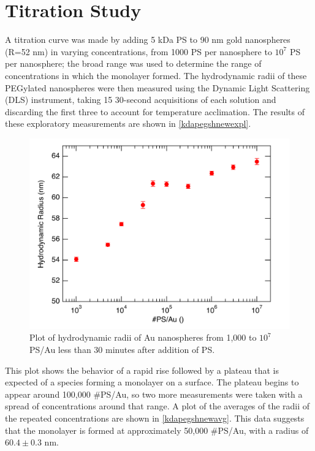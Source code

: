 \section{Titration Study}
\label{titrationstudy}

A titration curve was made by adding 5 kDa PS to 90 nm gold nanospheres (R=52 nm) in varying concentrations, from 1000 PS per nanosphere to $10^7$ PS per nanosphere; the broad range was used to determine the range of concentrations in which the monolayer formed. The hydrodynamic radii of these PEGylated nanospheres were then measured using the Dynamic Light Scattering (DLS) instrument, taking 15 30-second acquisitions of each solution and discarding the first three to account for temperature acclimation. The results of these exploratory measurements are shown in \autoref{kdapegshnewexpl}.

\begin{figure}[htbp]
\centering
\includegraphics[keepaspectratio,width=\textwidth,height=0.75\textheight]{./ImmediateExploratory.pdf}
\caption{Plot of hydrodynamic radii of Au nanospheres from 1,000 to $10^7$ PS\slash Au less than 30 minutes after addition of PS.}
\label{kdapegshnewexpl}
\end{figure}



This plot shows the behavior of a rapid rise followed by a plateau that is expected of a species forming a monolayer on a surface. The plateau begins to appear around 100,000 \#PS\slash Au, so two more measurements were taken with a spread of concentrations around that range. A plot of the averages of the radii of the repeated concentrations are shown in \autoref{kdapegshnewavg}. This data suggests that the monolayer is formed at approximately 50,000 \#PS\slash Au, with a radius of $60.4\pm0.3$ nm.

